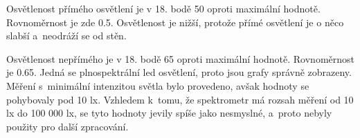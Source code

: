 Osvětlenost přímého osvětlení je v 18. bodě {50\pcent}  oproti maximální hodnotě. Rovnoměrnost je zde 0.5. Osvětlenost je nižší, protože přímé osvětlení
je o něco slabší a~neodráží se od stěn.

Osvětlenost nepřímého je v 18. bodě {65\pcent}  oproti maximální hodnotě. Rovnoměrnost je 0.65. Jedná se plnospektrální led osvětlení, proto
jsou grafy správně zobrazeny.
\medskip
Měření s~minimální intenzitou světla bylo provedeno, avšak hodnoty se pohybovaly pod 10 lx. Vzhledem k~tomu,
že spektrometr má rozsah měření od 10 lx do 100 000 lx, se tyto hodnoty jevily spíše jako nesmyslné, a~proto
nebyly použity pro další zpracování.


